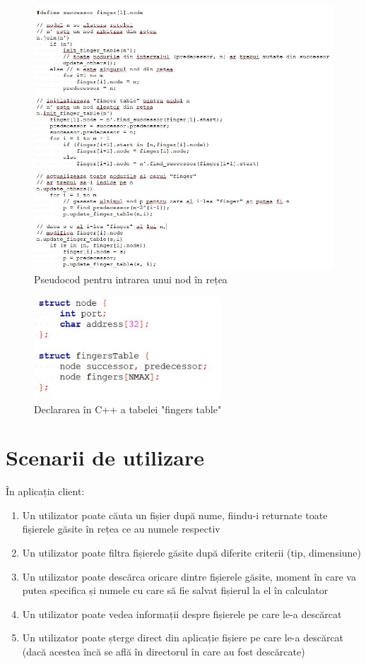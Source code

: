 \documentclass[runningheads]{llncs}
\begin{document}
\begin{figure}[!h]
	\centering
	\includegraphics[width=14cm]{node-join.jpg}
	\caption{Pseudocod pentru intrarea unui nod în rețea}
\end{figure}

\begin{figure}[!h]
	\centering
	\includegraphics[width=7cm]{chord-structs.jpg}
	\caption{Declararea în C++ a tabelei "fingers table"}
\end{figure}

\newpage

\section{Scenarii de utilizare}

În aplicația client:

\begin{enumerate}
	\item Un utilizator poate căuta un fișier după nume, fiindu-i returnate toate fișierele găsite în rețea ce au numele respectiv
	\item Un utilizator poate filtra fișierele găsite după diferite criterii (tip, dimensiune)
	\item Un utilizator poate descărca oricare dintre fișierele găsite, moment în care va putea specifica și numele cu care să fie salvat fișierul la el în calculator
	\item Un utilizator poate vedea informații despre fișierele pe care le-a descărcat
	\item Un utilizator poate șterge direct din aplicație fișiere pe care le-a descărcat (dacă acestea încă se află în directorul în care au fost descărcate)
\end{enumerate}
\end{document}
